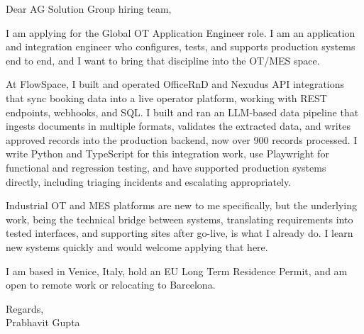 \documentclass[a4paper,11pt]{article}
\begin{document}
Dear AG Solution Group hiring team,

I am applying for the Global OT Application Engineer role. I am an application and integration engineer who configures, tests, and supports production systems end to end, and I want to bring that discipline into the OT/MES space.

At FlowSpace, I built and operated OfficeRnD and Nexudus API integrations that sync booking data into a live operator platform, working with REST endpoints, webhooks, and SQL. I built and ran an LLM-based data pipeline that ingests documents in multiple formats, validates the extracted data, and writes approved records into the production backend, now over 900 records processed. I write Python and TypeScript for this integration work, use Playwright for functional and regression testing, and have supported production systems directly, including triaging incidents and escalating appropriately.

Industrial OT and MES platforms are new to me specifically, but the underlying work, being the technical bridge between systems, translating requirements into tested interfaces, and supporting sites after go-live, is what I already do. I learn new systems quickly and would welcome applying that here.

I am based in Venice, Italy, hold an EU Long Term Residence Permit, and am open to remote work or relocating to Barcelona.

Regards,\\
Prabhavit Gupta
\end{document}
